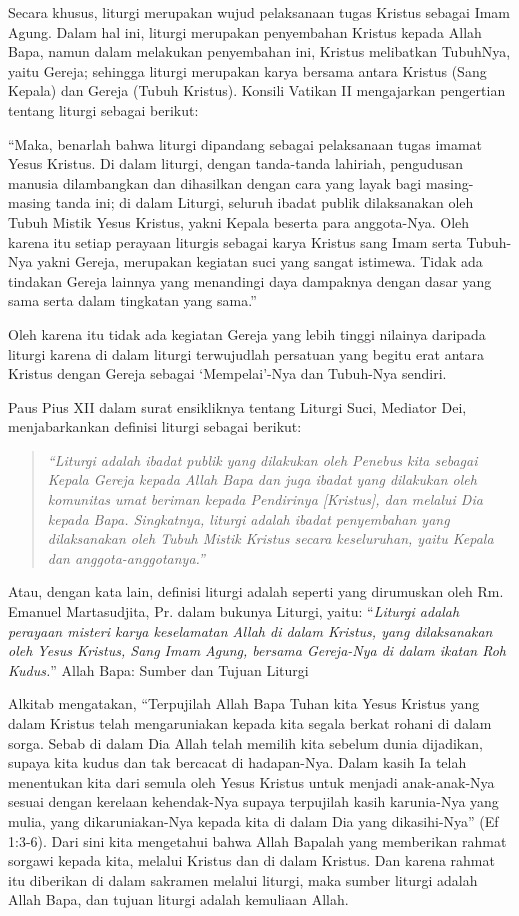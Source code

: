 Secara khusus, liturgi merupakan wujud pelaksanaan tugas Kristus sebagai Imam Agung. Dalam hal ini, liturgi merupakan penyembahan Kristus kepada Allah Bapa, namun dalam melakukan penyembahan ini, Kristus melibatkan TubuhNya, yaitu Gereja; sehingga liturgi merupakan karya bersama antara Kristus (Sang Kepala) dan Gereja (Tubuh Kristus). Konsili Vatikan II mengajarkan pengertian tentang liturgi sebagai berikut:

“Maka, benarlah bahwa liturgi dipandang sebagai pelaksanaan tugas imamat Yesus Kristus. Di dalam liturgi, dengan tanda-tanda lahiriah,  pengudusan manusia dilambangkan dan dihasilkan dengan cara yang layak bagi masing-masing tanda ini; di dalam Liturgi, seluruh ibadat publik dilaksanakan oleh Tubuh Mistik Yesus Kristus, yakni Kepala beserta para anggota-Nya.
Oleh karena itu setiap perayaan liturgis sebagai karya Kristus sang Imam serta Tubuh-Nya yakni Gereja, merupakan kegiatan suci yang sangat istimewa. Tidak ada tindakan Gereja lainnya yang menandingi daya dampaknya dengan dasar yang sama serta dalam tingkatan yang sama.”

Oleh karena itu tidak ada kegiatan Gereja yang lebih tinggi nilainya daripada liturgi karena di dalam liturgi terwujudlah persatuan yang begitu erat antara Kristus dengan Gereja sebagai ‘Mempelai’-Nya dan Tubuh-Nya sendiri.

Paus Pius XII dalam surat ensikliknya tentang Liturgi Suci, Mediator Dei, menjabarkankan definisi liturgi sebagai berikut:

\begin{quote}
\emph{“Liturgi adalah ibadat publik yang dilakukan oleh Penebus kita sebagai Kepala Gereja kepada Allah Bapa dan juga ibadat yang dilakukan oleh komunitas umat beriman kepada Pendirinya [Kristus], dan melalui Dia kepada Bapa. Singkatnya, liturgi adalah ibadat penyembahan yang dilaksanakan oleh Tubuh Mistik Kristus secara keseluruhan, yaitu Kepala dan anggota-anggotanya.”}
\end{quote}

Atau, dengan kata lain, definisi liturgi adalah seperti yang dirumuskan oleh Rm. Emanuel Martasudjita, Pr. dalam bukunya Liturgi, yaitu: “\textit{Liturgi adalah perayaan misteri karya keselamatan Allah di dalam Kristus, yang dilaksanakan oleh Yesus Kristus, Sang Imam Agung, bersama Gereja-Nya di dalam ikatan Roh Kudus.}”
Allah Bapa: Sumber dan Tujuan Liturgi

Alkitab mengatakan, “Terpujilah Allah Bapa Tuhan kita Yesus Kristus yang dalam Kristus telah mengaruniakan kepada kita segala berkat rohani di dalam sorga. Sebab di dalam Dia Allah telah memilih kita sebelum dunia dijadikan, supaya kita kudus dan tak bercacat di hadapan-Nya. Dalam kasih Ia telah menentukan kita dari semula oleh Yesus Kristus untuk menjadi anak-anak-Nya sesuai dengan kerelaan kehendak-Nya supaya terpujilah kasih karunia-Nya yang mulia, yang dikaruniakan-Nya kepada kita di dalam Dia yang dikasihi-Nya” (Ef 1:3-6). Dari sini kita mengetahui bahwa Allah Bapalah yang memberikan rahmat sorgawi kepada kita, melalui Kristus dan di dalam Kristus. Dan karena rahmat itu diberikan di dalam sakramen melalui liturgi, maka sumber liturgi adalah Allah Bapa, dan tujuan liturgi adalah kemuliaan Allah.

